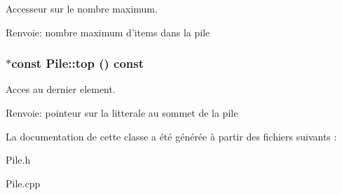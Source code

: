Accesseur sur le nombre maximum. 

\begin{Desc}
\item[Renvoie:]nombre maximum d'items dans la pile \end{Desc}
\hypertarget{class_pile_7e00e528aa0f5995a54941351659098f}{
\subsubsection[{top}]{ $\ast$const Pile::top () const}}
\label{class_pile_7e00e528aa0f5995a54941351659098f}


Acces au dernier element. 

\begin{Desc}
\item[Renvoie:]pointeur sur la litterale au sommet de la pile \end{Desc}


La documentation de cette classe a été générée à partir des fichiers suivants :\begin{CompactItemize}
\item 
Pile.h\item 
Pile.cpp\end{CompactItemize}
